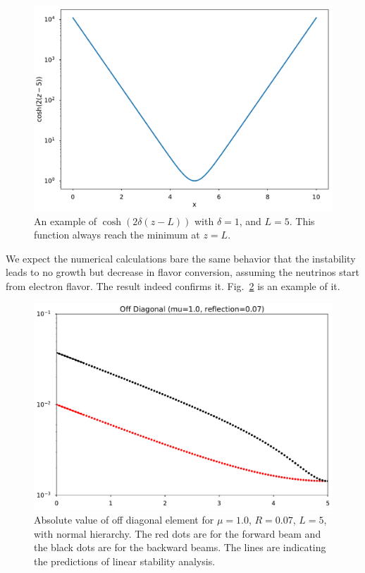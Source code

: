 \begin{figure}[!htbp]
    \centering
    \includegraphics[width=\textwidth]{chapters/assets/halo/cosh.pdf}
    \caption{ An example of $\cosh(2\delta(z-L))$ with $\delta=1$, and $L=5$. This function always reach the minimum at $z=L$.}
    \label{chap:halo-sec:line-sym-fig:cosh}
\end{figure}


We expect the numerical calculations bare the same behavior that the instability leads to no growth but decrease in flavor conversion, assuming the neutrinos start from electron flavor. The result indeed confirms it. Fig.~\ref{chap:halo-sec:line-sym-fig:mu-1.0-reflection-0.07} is an example of it.

\begin{figure}[htbp]
    \centering
    \includegraphics[width=\textwidth]{chapters/assets/halo/mu-1-reflection-0p07.pdf}
    \caption{Absolute value of off diagonal element for $\mu=1.0$, $R=0.07$, $L=5$, with normal hierarchy. The red dots are for the forward beam and the black dots are for the backward beams. The lines are indicating the predictions of linear stability analysis.}
    \label{chap:halo-sec:line-sym-fig:mu-1.0-reflection-0.07}
\end{figure}

